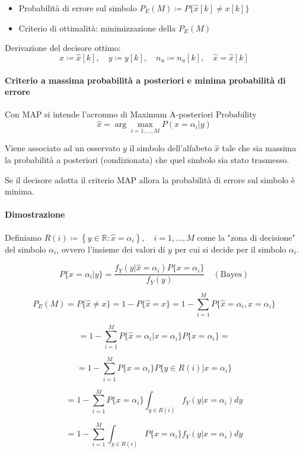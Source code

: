 \begin{itemize}
    \item Probabilità di errore sul simbolo
\(
P_E(M) \coloneqq P\{\hat{x}[k] \neq x[k]\}
\)
\item 
Criterio di ottimalità: minimizzazione della $P_E(M)$

\end{itemize}

Derivazione del decisore ottimo:
\[
x \coloneqq \hat{x}[k], \quad y \coloneqq y[k], \quad n_u \coloneqq n_u[k], \quad \hat{x} = \hat{x}[k]
\]

\paragraph{Criterio a massima probabilità a posteriori e minima probabilità di errore}
Con 
MAP si intende l'acronmo di Maximum A-posteriori Probability
\[
\hat{x} = \arg\max_{i=1,\ldots,M} P(x=\alpha_i|y)
\]

Viene associato ad un osservato $y$ il simbolo dell'alfabeto $\hat{x}$ tale che sia massima la probabilità a posteriori (condizionata) che quel simbolo sia stato trasmesso.

Se il decisore adotta il criterio MAP allora la probabilità di errore sul simbolo è minima.


\paragraph{Dimostrazione}

Definiamo 
\(
R(i) \coloneqq \left\{ y \in \mathbb{R} : \hat{x} = \alpha_i \right\}, \quad i = 1,\ldots,M
\)
come la "zona di decisione" del simbolo $\alpha_i$, ovvero l'insieme dei valori di $y$ per cui si decide per il simbolo $\alpha_i$.

\[
P\{x = \alpha_i | y\} = \frac{f_Y(y | \hat{x} = \alpha_i) P\{x = \alpha_i\}}{f_Y(y)} \quad (\text{Bayes})
\]

\[
P_E(M) = P\{\hat{x} \neq x\} = 1 - P\{\hat{x} = x\} = 1 - \sum_{i=1}^M P\{\hat{x} = \alpha_i, x = \alpha_i\}
\]

\[
= 1 - \sum_{i=1}^M P\{\hat{x} = \alpha_i | x = \alpha_i\} P\{x = \alpha_i\} =
\]

\[
= 1 - \sum_{i=1}^M P\{x = \alpha_i\} P\{y \in R(i) | x = \alpha_i\}
\]

\[
= 1 - \sum_{i=1}^M P\{x = \alpha_i\} \int_{y \in R(i)} f_Y(y | x = \alpha_i) dy
\]

\[
= 1 - \sum_{i=1}^M \int_{y \in R(i)} P\{x = \alpha_i\} f_Y(y | x = \alpha_i) dy
\]

